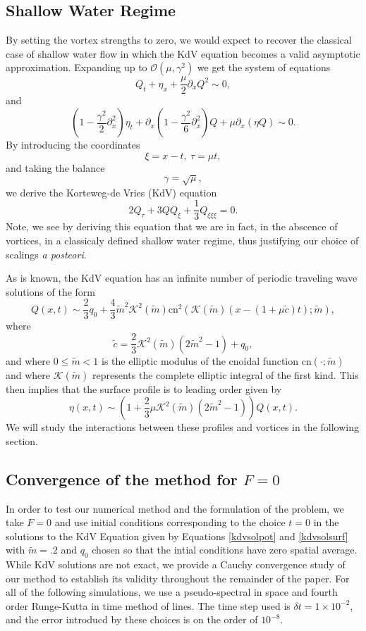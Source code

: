 \documentclass[a4paper,11pt]{article}
\newcommand{\p}{\partial}
\begin{document}
\subsection{Shallow Water Regime}
By setting the vortex strengths to zero, we would expect to recover the classical 
case of shallow water flow in which the KdV equation becomes a valid asymptotic approximation.  
Expanding up to $\mathcal{O}(\mu,\gamma^{2})$ we get the system of equations 
\[
Q_{t} + \eta_{x} + \frac{\mu}{2}\p_{x}Q^{2} \sim 0, 
\]
and
\[
\left(1 - \frac{\gamma^{2}}{2}\p_{x}^{2}\right)\eta_{t} + \p_{x}\left(1-\frac{\gamma^{2}}{6}\p_{x}^{2} \right)Q + \mu \p_{x}(\eta Q) \sim 0.
\]
By introducing the coordinates
\[
\xi = x - t, ~ \tau = \mu t, 
\]
and taking the balance 
\[
\gamma = \sqrt{\mu}, 
\]
we derive the Korteweg-de Vries (KdV) equation
\[
2Q_{\tau} + 3QQ_{\xi} + \frac{1}{3} Q_{\xi\xi\xi} = 0.
\]
Note, we see by deriving this equation that we are in fact, in the abscence of vortices, in a classicaly defined shallow water regime, thus justifying our choice of scalings {\it a posteori}.  

As is known, the KdV equation has an infinite number of periodic traveling wave solutions of the form 
\begin{equation}
Q(x,t) \sim \frac{2}{3}q_{0} + \frac{4}{3} \tilde{m}^{2}\mathcal{K}^2(\tilde{m})\mbox{cn}^{2}\left(\mathcal{K}(\tilde{m}) \left( x- \left(1 + \mu \tilde{c}\right)t\right);\tilde{m}\right),
\label{kdvsolpot}
\end{equation}
where
\[
\tilde{c} = \frac{2}{3}\mathcal{K}^{2}(\tilde{m}) (2\tilde{m}^{2}-1)+q_{0},
\]
and where $0\leq \tilde{m}<1$ is the elliptic modulus of the cnoidal function $\mbox{cn}(\cdot;\tilde{m})$ and where $\mathcal{K}(\tilde{m})$ represents the complete elliptic integral of the first kind.  This then implies that the surface profile is to leading order given by 
\begin{equation}
\eta(x,t) \sim \left(1+\frac{2}{3}\mu \mathcal{K}^{2}(\tilde{m})(2\tilde{m}^{2}-1)\right)Q(x,t).
\label{kdvsolsurf}
\end{equation}
We will study the interactions between these profiles and vortices in the following section.  
\subsection{Convergence of the method for $F=0$}

In order to test our numerical method and the formulation of the problem, we take $F=0$ and use initial conditions corresponding to the choice $t=0$ in the solutions to the KdV Equation given by Equations \eqref{kdvsolpot} and \eqref{kdvsolsurf} with $\tilde{m}=.2$ and $q_{0}$ chosen so that the intial conditions have zero spatial average.  While KdV solutions are not exact, we provide a Cauchy convergence study of our method to establish its validity throughout the remainder of the paper.  For all of the following simulations, we use a pseudo-spectral in space and fourth order Runge-Kutta in time method of lines.  The time step used is $\delta t = 1\times 10^{-2}$, and the error introducd by these choices is on the order of $10^{-8}$.   
\end{document}
